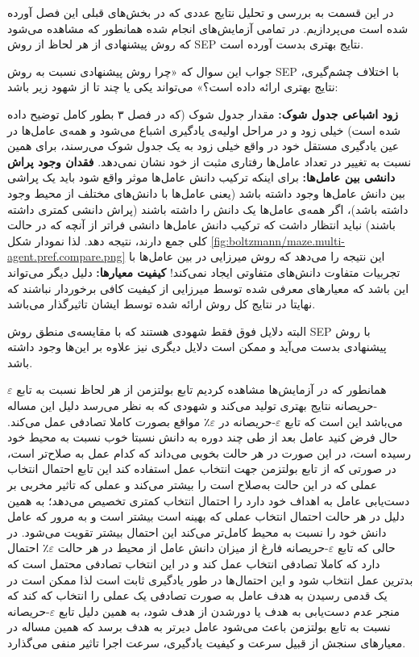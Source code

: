 در این قسمت به بررسی و تحلیل نتایج عددی که در بخش‌های قبلی این فصل آورده شده است می‌پردازیم. در تمامی آزمایش‌های انجام شده همانطور که مشاهده می‌شود که روش پیشنهادی از هر لحاظ از روش SEP نتایج بهتری بدست آورده است.

جواب این سوال که «چرا روش پیشنهادی نسبت به روش SEP با اختلاف چشم‌گیری، نتایج بهتری ارائه داده است؟» می‌تواند یکی یا چند تا از شهود زیر باشد:
\begin{enumerate}
 \textbf{زود اشباعی جدول شوک:} مقدار جدول شوک (که در فصل ۳ بطور کامل توضیح داده شده است) خیلی زود و در مراحل اولیه‌ی یادگیری اشباع می‌شود و همه‌ی عامل‌ها در عین یادگیری مستقل خود در واقع خیلی زود به یک جدول شوک می‌رسند، برای همین نسبت به تغییر در تعداد عامل‌ها رفتاری مثبت از خود نشان نمی‌دهد.
 \textbf{فقدان وجود پراش دانشی بین عامل‌ها:} برای اینکه ترکیب دانش عامل‌ها موثر واقع شود باید یک پراشی بین دانش عامل‌ها وجود داشته باشد (یعنی عامل‌ها با دانش‌های مختلف از محیط وجود داشته باشد)، اگر همه‌ی عامل‌ها یک دانش را داشته باشند (پراش دانشی کمتری داشته باشند) نباید انتظار داشت که ترکیب دانش عامل‌ها دانشی فراتر از آنچه که در حالت کلی جمع دارند، نتیجه دهد. لذا نمودار شکل \ref{fig:boltzmann/maze.multi-agent.pref.compare.png} این نتیجه را می‌دهد که روش میرزایی در بین عامل‌ها با تجربیات متفاوت دانش‌های متفاوتی ایجاد نمی‌کند!
 \textbf{کیفیت معیارها:} دلیل دیگر می‌تواند این باشد که معیار‌های معرفی شده توسط میرزایی از کیفیت کافی برخوردار نباشند که نهایتا در نتایج کل روش ارائه شده توسط ایشان تاثیرگذار می‌باشد.
\end{enumerate}
البته دلایل فوق فقط شهودی هستند که با مقایسه‌ی منطق روش SEP با روش پیشنهادی بدست می‌آید و ممکن است دلایل دیگری نیز علاوه بر این‌ها وجود داشته باشد.

همانطور که در آزمایش‌ها مشاهده کردیم تابع بولتزمن از هر لحاظ نسبت به تابع $\varepsilon$-حریصانه نتایج بهتری تولید می‌کند و شهودی که به نظر می‌رسد دلیل این مساله می‌باشد این است که تابع $\varepsilon$-حریصانه در $\varepsilon$٪ مواقع بصورت کاملا تصادفی عمل می‌کند. حال فرض کنید عامل بعد از طی چند دوره به دانش نسبتا خوب نسبت به محیط خود رسیده است، در این صورت در هر حالت بخوبی می‌داند که کدام عمل به صلاح‌تر است، در صورتی که از تابع بولتزمن جهت انتخاب عمل استفاده کند این تابع احتمال انتخاب عملی که در این حالت به‌صلاح است را بیشتر می‌کند و عملی که تاثیر مخربی بر دست‌یابی عامل به اهداف خود دارد را احتمال انتخاب کمتری تخصیص می‌دهد؛ به همین دلیل در هر حالت احتمال انتخاب عملی که بهینه‌ است بیشتر است و به مرور که عامل دانش خود را نسبت به محیط کامل‌تر می‌کند این احتمال بیشتر تقویت می‌شود. در حالی که تابع $\varepsilon$-حریصانه فارغ از میزان دانش عامل از محیط در هر حالت $\varepsilon$٪ احتمال دارد که کاملا تصادفی انتخاب عمل کند و در این انتخاب تصادفی محتمل است که بدترین عمل انتخاب شود و این احتمال‌ها در طور یادگیری ثابت است لذا ممکن است در یک قدمی رسیدن به هدف عامل به صورت تصادفی یک عملی را انتخاب که کند که منجر عدم دست‌یابی به هدف یا دورشدن از هدف شود، به همین دلیل تابع $\varepsilon$-حریصانه نسبت به تابع بولتزمن باعث می‌‌شود عامل دیرتر به هدف برسد که همین مساله در معیارهای سنجش از قبیل سرعت و کیفیت یادگیری، سرعت اجرا تاثیر منفی می‌گذارد.

